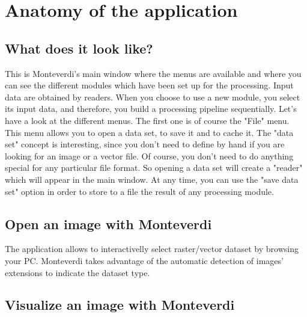 \documentclass{InsightSoftwareGuide}
\begin{document}
\chapter{Anatomy of the application}
\section{What does it look like?}
This is Monteverdi's main window where the menus are available and where you can see the different modules which have been 
set up for the processing. Input data are obtained by readers. When you choose to use a new module, you select its input data,
 and therefore, you build a processing pipeline sequentially. Let's have a look at the different menus. The first one is of
 course the "File" menu. This menu allows you to open a data set, to save it and to cache it. The "data set" concept is
 interesting, since you don't need to define by hand if you are looking for an image or a vector file. Of course, 
you don't need to do anything special for any particular file format. So opening a data set will create a "reader" 
which will appear in the main window. At any time, you can use the "save data set" option in order to store to a 
file the result of any processing module.
\section{Open an image with Monteverdi}
The application allows to interactivelly select raster/vector dataset by browsing your PC. Monteverdi takes
advantage of the automatic detection of images' extensions to indicate the dataset type.  
\section{Visualize an image with Monteverdi}
\end{document}
